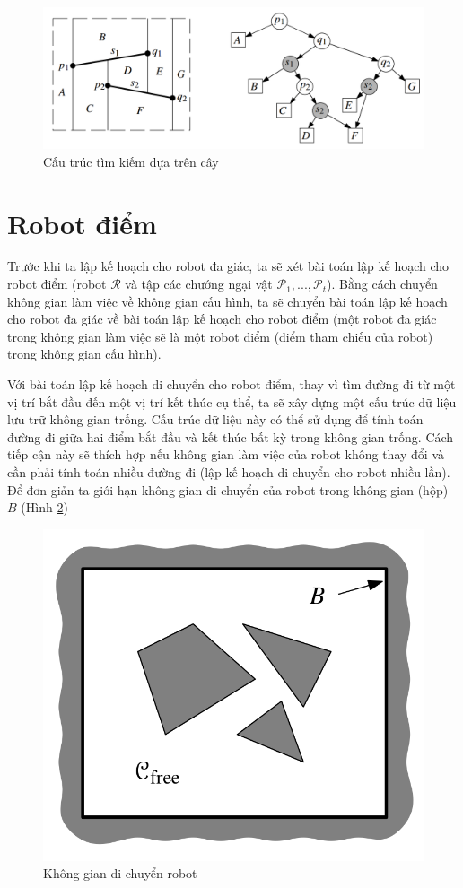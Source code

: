 \documentclass[a4paper,12pt]{report}
\begin{document}
\begin{figure}[H]
\centering
\includegraphics[scale=0.4]{trmap3.png}
\caption{Cấu trúc tìm kiếm dựa trên cây}
\label{object_pic}
\end{figure}

\section{Robot điểm}
Trước khi ta lập kế hoạch cho robot đa giác, ta sẽ xét bài toán lập kế hoạch cho robot điểm (robot $\mathcal{R}$ và tập các chướng ngại vật $\mathcal{P}_1,...,\mathcal{P}_t$). Bằng cách chuyển không gian làm việc về không gian cấu hình, ta sẽ chuyển bài toán lập kế hoạch cho robot đa giác về bài toán lập kế hoạch cho robot điểm (một robot đa giác trong không gian làm việc sẽ là một robot điểm (điểm tham chiếu của robot) trong không gian cấu hình).
\par Với bài toán lập kế hoạch di chuyển cho robot điểm, thay vì tìm đường đi từ một vị trí bắt đầu đến một vị trí kết thúc cụ thể, ta sẽ xây dựng một cấu trúc dữ liệu lưu trữ không gian trống. Cấu trúc dữ liệu này có thể sử dụng để tính toán đường đi giữa hai điểm bắt đầu và kết thúc bất kỳ trong không gian trống. Cách tiếp cận này sẽ thích hợp nếu không gian làm việc của robot không thay đổi và cần phải tính toán nhiều đường đi (lập kế hoạch di chuyển cho robot nhiều lần).\\[0.6em]
Để đơn giản ta giới hạn không gian di chuyển của robot trong không gian (hộp) $B$ (Hình \ref{fig_moving_space})
\begin{figure}[H]
\centering
\includegraphics[scale=0.25]{moving_space.png}
\caption{Không gian di chuyển robot}
\label{fig_moving_space}
\end{figure}
\end{document}
